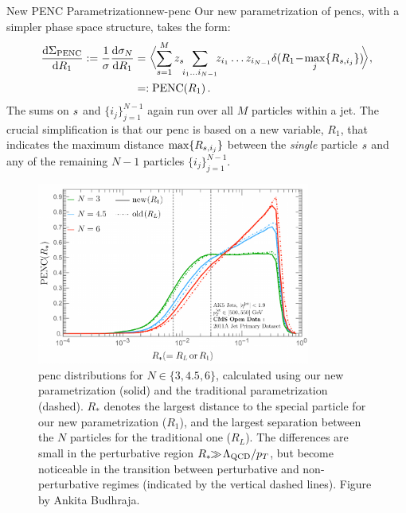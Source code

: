 \begin{definitionbox}{New PENC Parametrization}{new-penc}
    Our new parametrization of \glspl{penc}, with a simpler phase space structure, takes the form:
    \begin{align}
        \label{eq:new_def}
        \frac{\dd \Sigma_\text{PENC}}{\dd R_1}
        :=
        \frac{1}{\sigma}\frac{\dd \sigma_N}{\dd R_1}
        &=
        \biggl\langle
            \sum_{\izero=1}^M  z_{\izero} \!\!
            \sum_{i_1 \dots i_{N-1}}
           \!\! z_{i_1} \dots z_{i_{N-1}}
            \delta (
                R_1
                \!-\!
                \max_j\{R_{\izero,i_j}\}
            ) \!
        \biggr\rangle ,
        \notag \\
        &=: \text{PENC}(R_1) \,
        .
    \end{align}
    The sums on \(s\) and \(\{i_j\}_{j=1}^{N-1}\) again run over all $M$ particles within a jet.
    The crucial simplification is that our \gls{penc} is based on a new variable, \(R_1\), that indicates the maximum distance \(\max\{R_{s, i_j}\}\) between the \textit{single} particle \(s\) and any of the remaining $N-1$ particles \(\{i_j\}_{j=1}^{N-1}\).
\end{definitionbox}


\begin{figure}
    \centering
    \includegraphics[width=0.8\textwidth]{figures/eec-angles/ENC.pdf}
    \caption[%
        Comparisons of the new and traditional parametrizations of projected ENCs.
        Figure by Ankita Budhraja.
    ]{
        \gls{penc} distributions for $N \in \{3, 4.5, 6\}$, calculated using our new parametrization (solid) and the traditional parametrization (dashed).
        $R_{*}$ denotes the largest distance to the special particle for our new parametrization ($R_1$), and the largest separation between the $N$ particles for the traditional one ($R_L$).
        The differences are small in the perturbative region $R_{*} \!\! \gg  \! \Lambda_{\rm QCD} /p_T$, but become noticeable in the transition between perturbative and non-perturbative regimes (indicated by the vertical dashed lines).
        Figure by Ankita Budhraja.
    }
	\label{fig:ENC}%
\end{figure}

